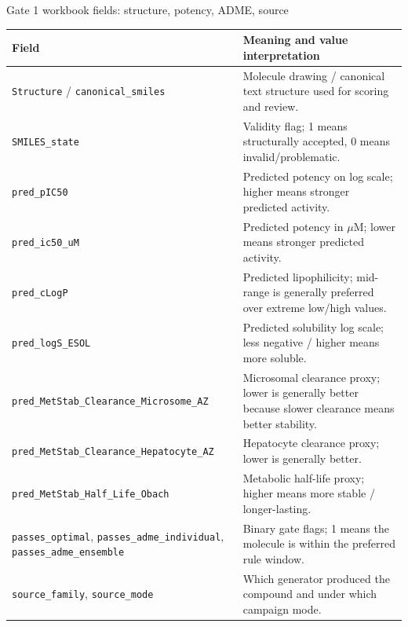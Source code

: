 \documentclass[aspectratio=169,10pt]{beamer}
\begin{document}
\begin{frame}{Gate 1 workbook fields: structure, potency, ADME, source}
  \scriptsize
  \begin{tabularx}{\textwidth}{lX}
    \toprule
    \textbf{Field} & \textbf{Meaning and value interpretation} \\
    \midrule
    \texttt{Structure} / \texttt{canonical\_smiles} & Molecule drawing / canonical text structure used for scoring and review. \\
    \texttt{SMILES\_state} & Validity flag; 1 means structurally accepted, 0 means invalid/problematic. \\
    \texttt{pred\_pIC50} & Predicted potency on log scale; higher means stronger predicted activity. \\
    \texttt{pred\_ic50\_uM} & Predicted potency in \(\mu\)M; lower means stronger predicted activity. \\
    \texttt{pred\_cLogP} & Predicted lipophilicity; mid-range is generally preferred over extreme low/high values. \\
    \texttt{pred\_logS\_ESOL} & Predicted solubility log scale; less negative / higher means more soluble. \\
    \texttt{pred\_MetStab\_Clearance\_Microsome\_AZ} & Microsomal clearance proxy; lower is generally better because slower clearance means better stability. \\
    \texttt{pred\_MetStab\_Clearance\_Hepatocyte\_AZ} & Hepatocyte clearance proxy; lower is generally better. \\
    \texttt{pred\_MetStab\_Half\_Life\_Obach} & Metabolic half-life proxy; higher means more stable / longer-lasting. \\
    \texttt{passes\_optimal}, \texttt{passes\_adme\_individual}, \texttt{passes\_adme\_ensemble} & Binary gate flags; 1 means the molecule is within the preferred rule window. \\
    \texttt{source\_family}, \texttt{source\_mode} & Which generator produced the compound and under which campaign mode. \\
    \bottomrule
  \end{tabularx}
\end{frame}
\end{document}
